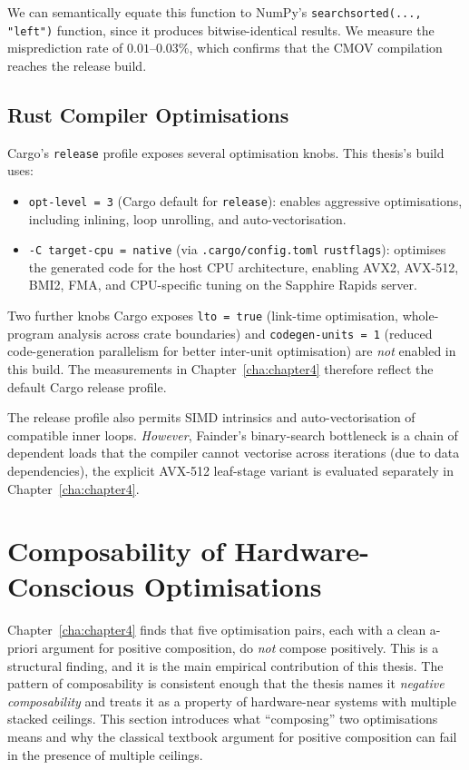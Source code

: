 We can semantically equate this function to NumPy's \texttt{searchsorted(..., "left")} function, since it produces bitwise-identical results. We measure the misprediction rate of $0.01$--$0.03\%$, which confirms that the CMOV compilation reaches the release build.

\subsection{Rust Compiler Optimisations}

Cargo's \texttt{release} profile exposes several optimisation knobs. This thesis's build uses:

\begin{itemize}
  \item \texttt{opt-level = 3} (Cargo default for \texttt{release}): enables aggressive optimisations, including inlining, loop unrolling, and auto-vectorisation.
  \item \texttt{-C target-cpu = native} (via \texttt{.cargo/config.toml} \texttt{rustflags}): optimises the generated code for the host CPU architecture, enabling AVX2, AVX-512, BMI2, FMA, and CPU-specific tuning on the Sapphire Rapids server.
\end{itemize}

Two further knobs Cargo exposes \texttt{lto = true} (link-time optimisation, whole-program analysis across crate boundaries) and \texttt{codegen-units = 1} (reduced code-generation parallelism for better inter-unit optimisation) are \emph{not} enabled in this build. The measurements in Chapter~\ref{cha:chapter4} therefore reflect the default Cargo release profile.

The release profile also permits SIMD intrinsics and auto-vectorisation of compatible inner loops. \emph{However}, Fainder's binary-search bottleneck is a chain of dependent loads that the compiler cannot vectorise across iterations (due to data dependencies), the explicit AVX-512 leaf-stage variant is evaluated separately in Chapter~\ref{cha:chapter4}.

\section{Composability of Hardware-Conscious Optimisations\label{sec:bg:composability}}

Chapter~\ref{cha:chapter4} finds that five optimisation pairs, each with a clean a-priori argument for positive composition, do \emph{not} compose positively. This is a structural finding, and it is the main empirical contribution of this thesis. The pattern of composability is consistent enough that the thesis names it \emph{negative composability} and treats it as a property of hardware-near systems with multiple stacked ceilings. This section introduces what ``composing'' two optimisations means and why the classical textbook argument for positive composition can fail in the presence of multiple ceilings.  

